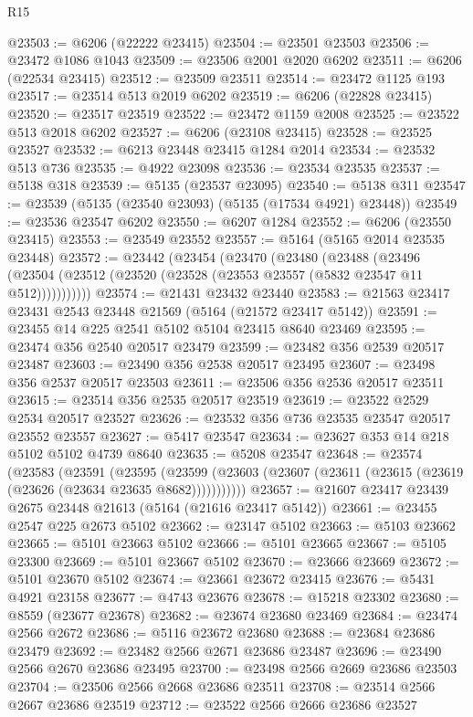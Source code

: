 \begin{lexlean}{R15}
\begin{coremodule}
{{{{{{{{{{{@23503 := @6206 (@22222 @23415)
@23504 := @23501 @23503
@23506 := @23472 @1086 @1043
@23509 := @23506 @2001 @2020 @6202
@23511 := @6206 (@22534 @23415)
@23512 := @23509 @23511
@23514 := @23472 @1125 @193
@23517 := @23514 @513 @2019 @6202
@23519 := @6206 (@22828 @23415)
@23520 := @23517 @23519
@23522 := @23472 @1159 @2008
@23525 := @23522 @513 @2018 @6202
@23527 := @6206 (@23108 @23415)
@23528 := @23525 @23527
@23532 := @6213 @23448 @23415 @1284 @2014
@23534 := @23532 @513 @736
@23535 := @4922 @23098
@23536 := @23534 @23535
@23537 := @5138 @318
@23539 := @5135 (@23537 @23095)
@23540 := @5138 @311
@23547 := @23539 (@5135 (@23540 @23093) (@5135 (@17534 @4921) @23448))
@23549 := @23536 @23547 @6202
@23550 := @6207 @1284
@23552 := @6206 (@23550 @23415)
@23553 := @23549 @23552
@23557 := @5164 (@5165 @2014 @23535 @23448)
@23572 := @23442
    (@23454
      (@23470
        (@23480
          (@23488
            (@23496 (@23504 (@23512 (@23520 (@23528 (@23553 @23557 (@5832 @23547 @11 @512)))))))))))
@23574 := @21431 @23432 @23440
@23583 := @21563 @23417 @23431 @2543 @23448 @21569 (@5164 (@21572 @23417 @5142))
@23591 := @23455 @14 @225 @2541 @5102 @5104 @23415 @8640 @23469
@23595 := @23474 @356 @2540 @20517 @23479
@23599 := @23482 @356 @2539 @20517 @23487
@23603 := @23490 @356 @2538 @20517 @23495
@23607 := @23498 @356 @2537 @20517 @23503
@23611 := @23506 @356 @2536 @20517 @23511
@23615 := @23514 @356 @2535 @20517 @23519
@23619 := @23522 @2529 @2534 @20517 @23527
@23626 := @23532 @356 @736 @23535 @23547 @20517 @23552 @23557
@23627 := @5417 @23547
@23634 := @23627 @353 @14 @218 @5102 @5102 @4739 @8640
@23635 := @5208 @23547
@23648 := @23574
    (@23583
      (@23591
        (@23595
          (@23599 (@23603 (@23607 (@23611 (@23615 (@23619 (@23626 (@23634 @23635 @8682)))))))))))
@23657 := @21607 @23417 @23439 @2675 @23448 @21613 (@5164 (@21616 @23417 @5142))
@23661 := @23455 @2547 @225 @2673 @5102
@23662 := @23147 @5102
@23663 := @5103 @23662
@23665 := @5101 @23663 @5102
@23666 := @5101 @23665
@23667 := @5105 @23300
@23669 := @5101 @23667 @5102
@23670 := @23666 @23669
@23672 := @5101 @23670 @5102
@23674 := @23661 @23672 @23415
@23676 := @5431 @4921 @23158
@23677 := @4743 @23676
@23678 := @15218 @23302
@23680 := @8559 (@23677 @23678)
@23682 := @23674 @23680 @23469
@23684 := @23474 @2566 @2672
@23686 := @5116 @23672 @23680
@23688 := @23684 @23686 @23479
@23692 := @23482 @2566 @2671 @23686 @23487
@23696 := @23490 @2566 @2670 @23686 @23495
@23700 := @23498 @2566 @2669 @23686 @23503
@23704 := @23506 @2566 @2668 @23686 @23511
@23708 := @23514 @2566 @2667 @23686 @23519
@23712 := @23522 @2566 @2666 @23686 @23527
}}}}}}}}}}}
\end{coremodule}
\end{lexlean}
